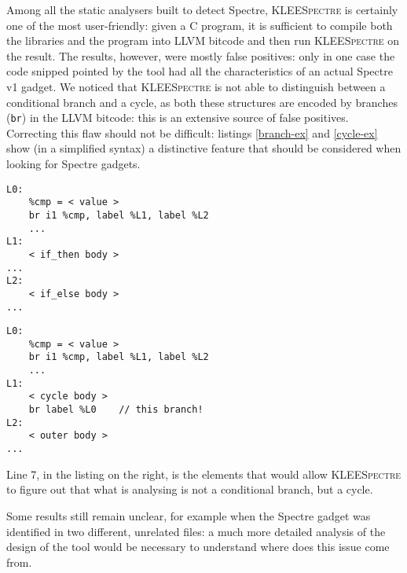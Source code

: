 \documentclass[target=mst,aauheader=aics]{thud}
\theoremstyle{definition}
\begin{document}
	Among all the static analysers built to detect Spectre, \textsc{KLEESpectre} is certainly one of the most user-friendly: given a C program, it is sufficient to compile both the libraries and the program into LLVM bitcode and then run \textsc{KLEESpectre} on the result. The results, however, were mostly false positives: only in one case the code snipped pointed by the tool had all the characteristics of an actual Spectre v1 gadget. We noticed that \textsc{KLEESpectre} is not able to distinguish between a conditional branch and a cycle, as both these structures are encoded by branches (\texttt{br}) in the LLVM bitcode: this is an extensive source of false positives. Correcting this flaw should not be difficult: listings \ref{branch-ex} and \ref{cycle-ex} show (in a simplified syntax) a distinctive feature that should be considered when looking for Spectre gadgets.
	
	\begin{minipage}{0.45\textwidth}
	\begin{lstlisting}[basicstyle=\scriptsize\ttfamily, caption={\small LLVM bitcode fragment a conditional branch\vspace{2mm}}, label=branch-ex]
L0:	
	%cmp = < value >
  	br i1 %cmp, label %L1, label %L2
	...
L1:
  	< if_then body >
...
L2:
  	< if_else body >
...
	\end{lstlisting}
	\end{minipage}\hfill
	\begin{minipage}{0.45\textwidth}
	\begin{lstlisting}[basicstyle=\scriptsize\ttfamily, caption={\small LLVM bitcode fragment encoding a cycle\vspace{2mm}}, numbers=right, label=cycle-ex]
L0:
 	%cmp = < value >
 	br i1 %cmp, label %L1, label %L2
  	...
L1:
  	< cycle body >
  	br label %L0	// this branch!
L2:
  	< outer body >
...
	\end{lstlisting}
	\end{minipage}
	\vspace{3mm}
	
	Line 7, in the listing on the right, is the elements that would allow \textsc{KLEESpectre} to figure out that what is analysing is not a conditional branch, but a cycle.
	
	Some results still remain unclear, for example when the Spectre gadget was identified in two different, unrelated files: a much more detailed analysis of the design of the tool would be necessary to understand where does this issue come from.
\end{document}
